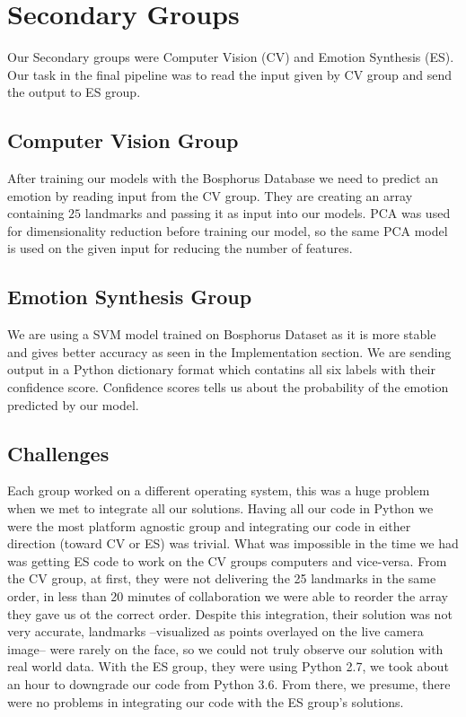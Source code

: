 \section{Secondary Groups}

Our Secondary groups were Computer Vision (CV) and Emotion Synthesis (ES). Our task in the final pipeline was to read the input given by CV group and send the output to ES group.

\subsection{Computer Vision Group}
After training our models with the Bosphorus Database we need to predict an emotion by reading input from the CV group. They are creating an array containing $25$ landmarks and passing it as input into our models. PCA was used for dimensionality reduction before training our model, so the same PCA model is used on the given input for reducing the number of features.

\subsection{Emotion Synthesis Group}
We are using a SVM model trained on Bosphorus Dataset as it is more stable and gives better accuracy as seen in the Implementation section. We are sending output in a Python dictionary format which contatins all six labels with their confidence score. Confidence scores tells us about the probability of the emotion predicted by our model. %

\subsection{Challenges}
Each group worked on a different operating system, this was a huge problem when we met to integrate all our solutions. Having all our code in Python we were the most platform agnostic group and integrating our code in either direction (toward CV or ES) was trivial. What was impossible in the time we had was getting ES code to work on the CV groups computers and vice-versa. From the CV group, at first, they were not delivering the 25 landmarks in the same order, in less than 20 minutes of collaboration we were able to reorder the array they gave us ot the correct order. Despite this integration, their solution was not very accurate, landmarks --visualized as points overlayed on the live camera image-- were rarely on the face, so we could not truly observe our solution with real world data. With the ES group, they were using Python 2.7, we took about an hour to downgrade our code from Python 3.6. From there, we presume, there were no problems in integrating our code with the ES group's solutions.
